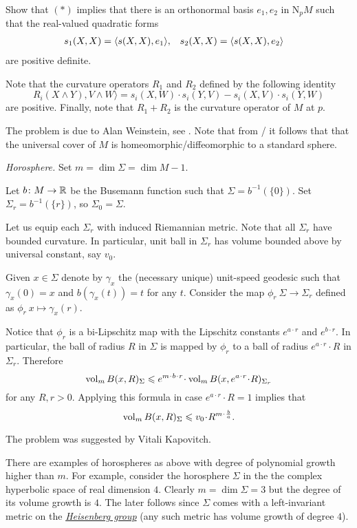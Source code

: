 Show that $({*})$ implies that there is an orthonormal basis $e_1,e_2$ in $\mathrm{N}_pM$ 
such that the real-valued quadratic forms 
\begin{align*}
s_1(X,X)&=\langle s(X,X),e_1\rangle,
&
s_2(X,X)&=\langle s(X,X),e_2\rangle
\end{align*}
are positive definite.

Note that the curvature operators $R_1$ and $R_2$ defined by the following identity
\[R_{i}(X\wedge Y), V\wedge W\rangle 
=s_i(X,W)\cdot s_i(Y,V)-s_i(X,V)\cdot s_i(Y,W)\]
 are positive.
Finally, note that $R_{1}+R_{2}$ is the curvature operator of $M$ at $p$.

The problem is due to Alan Weinstein, see  \cite{weinstein}.
Note that from \cite{micallef-moore}/\cite{boehm-wilking} it follows that
that the universal cover of $M$ is homeomorphic/diffeomorphic to a standard sphere.



\textit{Horosphere.}
Set 
$m=\dim \Sigma=\dim M-1$.

Let $b\colon M\to\mathbb{R}$ be the Busemann function such that $\Sigma=b^{-1}(\{0\})$.
Set  $\Sigma_r=b^{-1}(\{r\})$, so $\Sigma_0=\Sigma$.

Let us equip each $\Sigma_r$ with induced Riemannian metric.
Note that all $\Sigma_r$ have bounded curvature.
In particular, unit ball in $\Sigma_r$ has volume bounded above by universal constant, say $v_0$.
 

Given $x\in \Sigma$ denote by $\gamma_x$ 
the (necessary unique) unit-speed geodesic
such that $\gamma_x(0)=x$ and $b(\gamma_x(t))=t$ for any $t$.
Consider the map $\phi_{r}\:\Sigma\to\Sigma_r$ defined as
$\phi_r\:x\mapsto \gamma_x(r)$.

Notice that $\phi_r$ is a bi-Lipschitz map with the Lipschitz constants $e^{a\cdot r}$ and $e^{b\cdot r}$.
In particular, the ball of radius $R$ in $\Sigma$ is mapped by $\phi_r$
to a ball of radius $e^{a\cdot r}\cdot R$ in $\Sigma_r$.
Therefore
\[\vol_m B(x,R)_\Sigma\le e^{m\cdot b\cdot r}\cdot \vol_m B(x,e^{a\cdot r}\cdot R)_{\Sigma_r}\]
for any $R,r>0$.
Applying this formula in case $e^{a\cdot r}\cdot R=1$ implies that
\[\vol_m B(x,R)_\Sigma\le v_0\cdot R^{m\cdot \frac ba}.\]

The problem was suggested by Vitali Kapovitch.

There are examples of horospheres as above with degree of polynomial growth higher than $m$.
For example, consider the horosphere $\Sigma$ in the
the complex hyperbolic space 
of real dimension $4$.
Clearly $m=\dim \Sigma=3$ but the degree of its volume growth is $4$.
The later follows since $\Sigma$ comes with a left-invariant metric on the \hyperref[Heisenberg group]{\emph{Heisenberg group}} (any such metric has volume  growth of degree $4$).


